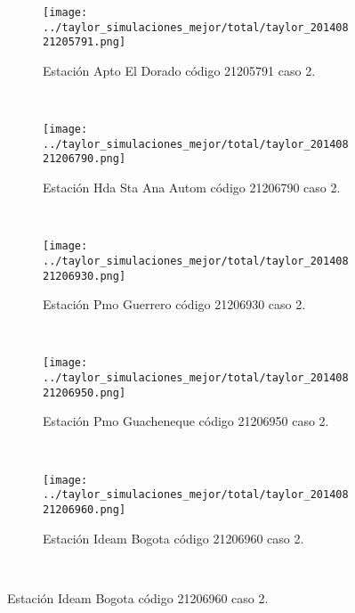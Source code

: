 \begin{figure}[H]\ContinuedFloat
\centering
\begin{subfigure}[normla]{0.4\textwidth}
\texttt{[image: ../taylor\_simulaciones\_mejor/total/taylor\_20140821205791.png]}
\caption{Estación Apto El Dorado código 21205791 caso 2.}
\end{subfigure}
~
\begin{subfigure}[normla]{0.4\textwidth}
\texttt{[image: ../taylor\_simulaciones\_mejor/total/taylor\_20140821206790.png]}
\caption{Estación Hda Sta Ana Autom código 21206790 caso 2.}
\end{subfigure}
~
\begin{subfigure}[normla]{0.4\textwidth}
\texttt{[image: ../taylor\_simulaciones\_mejor/total/taylor\_20140821206930.png]}
\caption{Estación Pmo Guerrero código 21206930 caso 2.}
\end{subfigure}
~
\begin{subfigure}[normla]{0.4\textwidth}
\texttt{[image: ../taylor\_simulaciones\_mejor/total/taylor\_20140821206950.png]}
\caption{Estación Pmo Guacheneque código 21206950 caso 2.}
\end{subfigure}
~
\begin{subfigure}[normla]{0.4\textwidth}
\texttt{[image: ../taylor\_simulaciones\_mejor/total/taylor\_20140821206960.png]}
\caption{Estación Ideam Bogota código 21206960 caso 2.}
\end{subfigure}
~
~
\end{figure}
 
